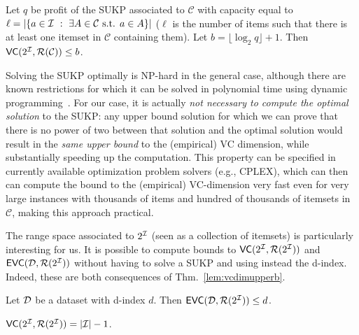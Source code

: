 \begin{corollary}\label{lem:sukpvc}
  Let $q$ be profit of the SUKP associated to $\mathcal{C}$ with capacity
  equal to $\ell=|\{a\in{\cal I} ~:~ \exists A\in\mathcal{C} \mbox{ s.t. } a\in
  A\}|$ ($\ell$ is the number of items such that there is at least one itemset in $\mathcal{C}$ containing
  them).
  Let $b=\lfloor\log_2 q\rfloor + 1$. Then
  $\mathsf{VC}(2^{\cal I},\mathcal{R}(\mathcal{C}))\le b$. %
\end{corollary}

Solving the SUKP optimally is NP-hard in the general case, although there are
known restrictions for which it can be solved in polynomial time using dynamic
programming~\citep{GoldschmidtNY94}. 
For our case, it is actually \emph{not necessary to compute the optimal
solution} to the SUKP: any upper bound solution for which we can prove that
there is no power of two between that solution and the optimal solution would
result in the \emph{same upper bound} to the (empirical) VC dimension, while
substantially speeding up the computation. This property can be specified in
currently available optimization problem solvers (e.g., CPLEX), which can then
can compute the bound to the (empirical) VC-dimension very fast even for very
large instances with thousands of items and hundred of thousands of itemsets in
$\mathcal{C}$, making this approach practical. %


The range space associated to $2^{\cal I}$ (seen as a collection of itemsets) is
particularly interesting for us. It is possible  %
to compute bounds to $\mathsf{VC}(2^{\cal I},\mathcal{R}(2^{\cal I}))$ and
$\mathsf{EVC}({\cal D},\mathcal{R}(2^{\cal I}))$ without having to solve a SUKP and using instead the
d-index. Indeed, these are
both consequences of Thm.~\ref{lem:vcdimupperb}. 
\begin{corollary}\label{coroll:empvcdimubfirst}
  Let ${\cal D}$ be a dataset with d-index $d$. Then $\mathsf{EVC}({\cal D},\mathcal{R}(2^{\cal I}))\le d$.
\end{corollary}

\begin{corollary}\label{coroll:vcdimubfirst}
$\mathsf{VC}(2^{\cal I},\mathcal{R}(2^{\cal I}))=|{\cal I}|-1$.
\end{corollary}

